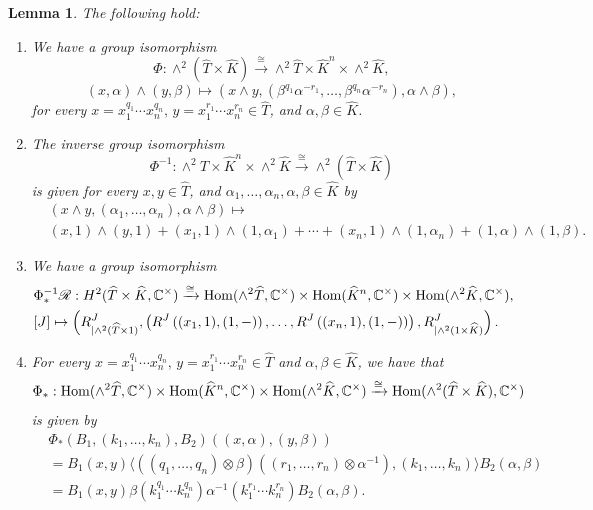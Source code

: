 \documentclass{amsart}
\newtheorem{lemma}[theorem]{Lemma}
\theoremstyle{definition}
\newcommand{\Hom}{{\rm Hom}}
\newcommand{\ot}{\otimes}
\numberwithin{equation}{section}
\begin{document}
\begin{lemma}\label{variousgrisoms}
The following hold:
\begin{enumerate}
\item
We have a group isomorphism
$$\Phi:\wedge^2(\widehat{T}\times \widehat{K})\xrightarrow{\cong}\wedge^2\widehat{T}\times \widehat{K}^n\times \wedge^2\widehat{K},$$
$$(x,\alpha)\wedge (y,\beta)\mapsto (x\wedge y,(\beta^{q_1}\alpha^{-r_1},\dots,\beta^{q_n}\alpha^{-r_n}),\alpha\wedge\beta),$$
for every $x=x_1^{q_1}\cdots x_n^{q_n},\,y=x_1^{r_1}\cdots x_n^{r_n}\in \widehat{T}$, and 
$\alpha,\beta\in \widehat{K}$.
\item
The inverse group isomorphism 
$$\Phi^{-1}:\wedge^2\widehat{T}\times \widehat{K}^n\times \wedge^2\widehat{K}\xrightarrow{\cong}\wedge^2(\widehat{T}\times \widehat{K})$$
is given for every $x,y\in \widehat{T}$, and $\alpha_1,\dots,\alpha_n,\alpha,\beta\in \widehat{K}$ 
by 
\begin{equation*}
\begin{split}
&\left(x\wedge y,(\alpha_1,\dots,\alpha_n),\alpha\wedge\beta\right)\mapsto \\
& (x,1)\wedge (y,1)+(x_1,1)\wedge (1,\alpha_1)+\cdots +(x_n,1)\wedge (1,\alpha_n)+(1,\alpha)\wedge(1,\beta).
\end{split}
\end{equation*}
\item
We have a group isomorphism
\begin{equation*}
\begin{split}
& \Phi^{-1}_*\mathscr{R}:H^2(\widehat{T}\times \widehat{K},\mathbb{C}^{\times})\xrightarrow{\cong} \Hom(\wedge^2\widehat{T},\mathbb{C}^{\times})\times \Hom(\widehat{K}^n,\mathbb{C}^{\times})\times \Hom(\wedge^2\widehat{K},\mathbb{C}^{\times}),\\
& [J]\mapsto \left(R^J_{\mid \wedge^2(\widehat{T}\times 1)},\left(R^J\left((x_1,1),(1,-)\right),\dots,R^J\left((x_n,1),(1,-)\right)\right),R^J_{\mid \wedge^2(1\times \widehat{K})}\right).
\end{split}
\end{equation*}
\item
For every $x=x_1^{q_1}\cdots x_n^{q_n},\,y=x_1^{r_1}\cdots x_n^{r_n}\in \widehat{T}$ and 
$\alpha,\beta\in \widehat{K}$, we have that
$$\Phi_*:\Hom(\wedge^2\widehat{T},\mathbb{C}^{\times})\times \Hom(\widehat{K}^n,\mathbb{C}^{\times})\times \Hom(\wedge^2\widehat{K},\mathbb{C}^{\times})\xrightarrow{\cong}\Hom(\wedge^2(\widehat{T}\times \widehat{K}),\mathbb{C}^{\times})$$
is given by
\begin{equation*}
\begin{split}
& \Phi_*\left(B_1,(k_1,\dots,k_n),B_2\right)((x,\alpha),(y,\beta))\\
&=B_1(x,y) \langle ((q_1,\dots, q_n)\ot\beta)((r_1,\dots, r_n)\ot\alpha^{-1}),(k_1,\dots,k_n)\rangle B_2(\alpha,\beta)\\
&=B_1(x,y) \beta(k_1^{q_1}\cdots k_n^{q_n})\alpha^{-1}(k_1^{r_1}\cdots k_n^{r_n}) B_2(\alpha,\beta).
\end{split}
\end{equation*}
\end{enumerate}
\end{lemma}
\end{document}
